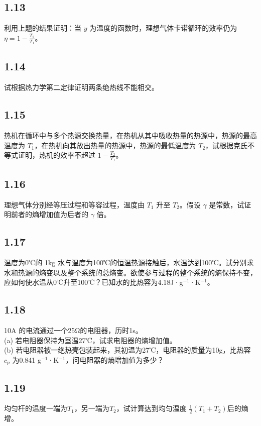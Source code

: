 \newpage
\subsection{1.13}
利用上题的结果证明：当 $y$ 为温度的函数时，理想气体卡诺循环的效率仍为 $\eta = 1 - \frac{T_2}{T_1}$。

\newpage
\subsection{1.14}
试根据热力学第二定律证明两条绝热线不能相交。

\newpage
\subsection{1.15}
热机在循环中与多个热源交换热量，在热机从其中吸收热量的热源中，热源的最高温度为 $T_1$，在热机向其放出热量的热源中，热源的最低温度为 $T_2$，试根据克氏不等式证明，热机的效率不超过 $1 - \frac{T_2}{T_1}$。

\newpage
\subsection{1.16}
理想气体分别经等压过程和等容过程，温度由 $T_1$ 升至 $T_2$。假设 $\gamma$ 是常数，试证明前者的熵增加值为后者的 $\gamma$ 倍。

\newpage
\subsection{1.17}
温度为0℃的 1kg 水与温度为100℃的恒温热源接触后，水温达到100℃。试分别求水和热源的熵变以及整个系统的总熵变。欲使参与过程的整个系统的熵保持不变，应如何使水温从0℃升至100℃？已知水的比热容为4.18J·g$^{-1}$·K$^{-1}$。

\newpage
\subsection{1.18}
10A 的电流通过一个25Ω的电阻器，历时1s。\\
(a) 若电阻器保持为室温27℃，试求电阻器的熵增加值。\\
(b) 若电阻器被一绝热壳包装起来，其初温为27℃，电阻器的质量为10g，比热容 $c_p$ 为0.841 g$^{-1}$·K$^{-1}$，问电阻器的熵增加值为多少？

\newpage
\subsection{1.19}
均匀杆的温度一端为$T_1$，另一端为$T_2$，试计算达到均匀温度 $\frac{1}{2}(T_1 + T_2)$后的熵增。

